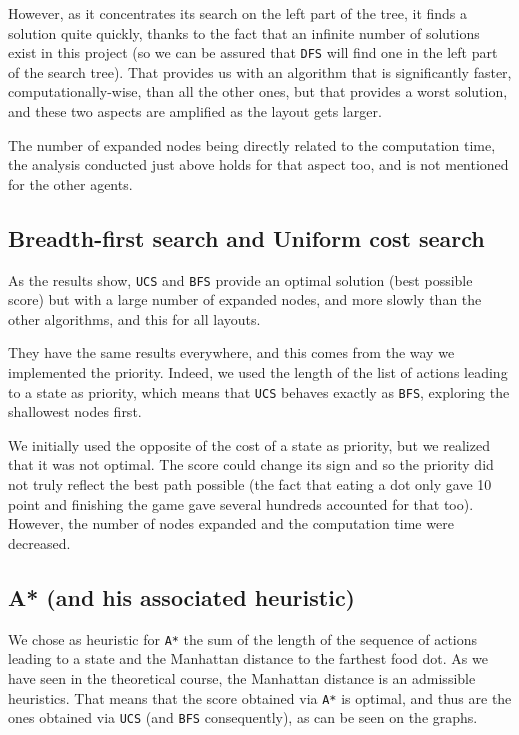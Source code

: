 \documentclass[a4paper, 12pt]{article}
\begin{document}
	However, as it concentrates its search on the left part of the tree, it finds a solution quite quickly, thanks to the fact that an infinite number of solutions exist in this project (so we can be assured that \texttt{DFS} will find one in the left part of the search tree). That provides us with an algorithm that is significantly faster, computationally-wise, than all the other ones, but that provides a worst solution, and these two aspects are amplified as the layout gets larger.\par
	
	The number of expanded nodes being directly related to the computation time, the analysis conducted just above holds for that aspect too, and is not mentioned for the other agents.
	
	\subsection{Breadth-first search and Uniform cost search}
	As the results show, \texttt{UCS} and \texttt{BFS} provide an optimal solution (best possible score) but with a large number of expanded nodes, and more slowly than the other algorithms, and this for all layouts.\par
	
	They have the same results everywhere, and this comes from the way we implemented the priority. Indeed, we used the length of the list of actions leading to a state as priority, which means that \texttt{UCS} behaves exactly as \texttt{BFS}, exploring the shallowest nodes first.\par
	
	We initially used the opposite of the cost of a state as priority, but we realized that it was not optimal. The score could change its sign and so the priority did not truly reflect the best path possible (the fact that eating a dot only gave 10 point and finishing the game gave several hundreds accounted for that too). However, the number of nodes expanded and the computation time were decreased.
	
	\subsection{A* (and his associated heuristic)}
	We chose as heuristic for \texttt{A*} the sum of the length of the sequence of actions leading to a state and the Manhattan distance to the farthest food dot. As we have seen in the theoretical course, the Manhattan distance is an admissible heuristics. That means that the score obtained via \texttt{A*} is optimal, and thus are the ones obtained via \texttt{UCS} (and \texttt{BFS} consequently), as can be seen on the graphs.\par
	
\end{document}
